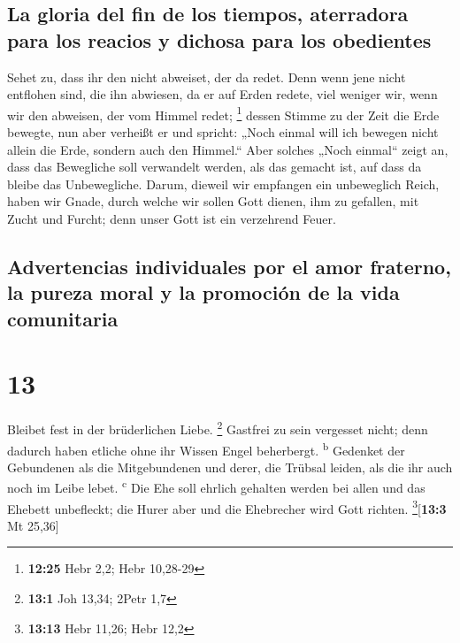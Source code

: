\hypertarget{la-gloria-del-fin-de-los-tiempos-aterradora-para-los-reacios-y-dichosa-para-los-obedientes}{%
\subsection{La gloria del fin de los tiempos, aterradora para los
reacios y dichosa para los
obedientes}\label{la-gloria-del-fin-de-los-tiempos-aterradora-para-los-reacios-y-dichosa-para-los-obedientes}}

 Sehet zu, dass ihr den nicht abweiset, der da redet.
Denn wenn jene nicht entflohen sind, die ihn abwiesen, da er auf Erden
redete, viel weniger wir, wenn wir den abweisen, der vom Himmel redet;
\footnote{\textbf{12:25} Hebr 2,2; Hebr 10,28-29}  dessen
Stimme zu der Zeit die Erde bewegte, nun aber verheißt er und spricht:
„Noch einmal will ich bewegen nicht allein die Erde, sondern auch den
Himmel.``  Aber solches „Noch einmal`` zeigt an, dass das
Bewegliche soll verwandelt werden, als das gemacht ist, auf dass da
bleibe das Unbewegliche.  Darum, dieweil wir empfangen
ein unbeweglich Reich, haben wir Gnade, durch welche wir sollen Gott
dienen, ihm zu gefallen, mit Zucht und Furcht;  denn
unser Gott ist ein verzehrend Feuer.

\hypertarget{advertencias-individuales-por-el-amor-fraterno-la-pureza-moral-y-la-promociuxf3n-de-la-vida-comunitaria}{%
\subsection{Advertencias individuales por el amor fraterno, la pureza
moral y la promoción de la vida
comunitaria}\label{advertencias-individuales-por-el-amor-fraterno-la-pureza-moral-y-la-promociuxf3n-de-la-vida-comunitaria}}

\hypertarget{section-12}{%
\section{13}\label{section-12}}

 Bleibet fest in der brüderlichen Liebe. \footnote{\textbf{13:1}
  Joh 13,34; 2Petr 1,7}  Gastfrei zu sein vergesset nicht;
denn dadurch haben etliche ohne ihr Wissen Engel beherbergt.
\textsuperscript{b}  Gedenket der Gebundenen als die
Mitgebundenen und derer, die Trübsal leiden, als die ihr auch noch im
Leibe lebet. \textsuperscript{c}  Die Ehe soll ehrlich
gehalten werden bei allen und das Ehebett unbefleckt; die Hurer aber und
die Ehebrecher wird Gott richten. \footnote{\textbf{13:13} Hebr 11,26;
  Hebr 12,2}{[}\textbf{13:3} Mt 25,36{]}

